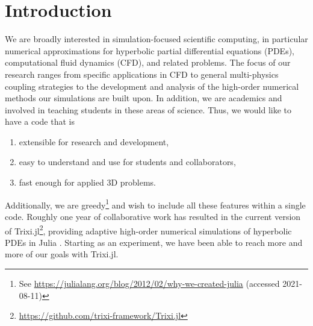 \documentclass[hidelinks]{juliacon} %
\newcommand{\trixi}{Trixi.jl\xspace}
\begin{document}


\maketitle

\begin{abstract}
We present Trixi.jl, a Julia package for adaptive high-order numerical simulations
of hyperbolic partial differential equations. Utilizing Julia's strengths,
Trixi.jl is extensible, easy to use, and fast. We describe the main design choices
that enable these features and compare Trixi.jl with a mature open
source Fortran code that uses the same numerical methods.
We conclude with an assessment of Julia for simulation-focused scientific
computing, an area that is still dominated by traditional high-performance
computing languages such as C, C++, and Fortran.
\end{abstract}


\section{Introduction}

We are broadly interested in simulation-focused scientific computing, in particular
numerical approximations for hyperbolic partial differential equations (PDEs), computational fluid dynamics (CFD),
and related problems. The focus of our research ranges from specific applications
in CFD to general multi-physics coupling strategies to the development and analysis of the high-order numerical methods
our simulations are built upon. In addition, we are academics and involved in teaching
students in these areas of science. Thus, we would like to have a
code that is
\begin{enumerate}
  \item extensible for research and development,
  \item easy to understand and use for students and collaborators,
  \item fast enough for applied 3D problems.
\end{enumerate}
Additionally, we are greedy\footnote{See \url{https://julialang.org/blog/2012/02/why-we-created-julia} (accessed 2021-08-11)}
and wish to include all these features within a single code.
Roughly one year of collaborative work has resulted in the current version of
\trixi\footnote{\url{https://github.com/trixi-framework/Trixi.jl}}, providing adaptive
high-order numerical simulations of hyperbolic PDEs
in Julia \cite{bezanson2017julia}. Starting as an experiment, we have been able
to reach more and more of our goals with \trixi.
\end{document}
